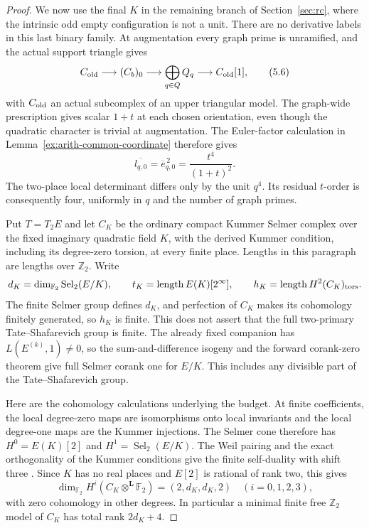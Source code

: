 \documentclass[11pt]{article}
\theoremstyle{definition}
\theoremstyle{remark}
\begin{document}
\begin{proof}\leavevmode
We now use the final $K$ in the remaining branch of Section~\ref{sec:rc},
where the intrinsic odd empty configuration is not a unit.
There are no derivative labels in this
last binary family. At augmentation every graph prime is unramified,
and the actual support triangle gives
\[
 C_{\rm old}\longrightarrow(C_b)_0
       \longrightarrow\bigoplus_{q\in Q}Q_q\longrightarrow C_{\rm old}[1],
                                                                    \tag{5.6}
\]
with $C_{\rm old}$ an actual subcomplex of an upper triangular model.
The graph-wide prescription gives scalar $1+t$ at each chosen
orientation, even though the quadratic character is trivial at
augmentation. The Euler-factor calculation in
Lemma~\ref{ex:arith-common-coordinate} therefore gives
\[
 \overline{l_{q,0}}=\overline e_{q,0}^{\,2}
                  =\frac{t^4}{(1+t)^2}.
\]
The two-place local determinant differs only by the unit $q^4$.
Its residual $t$-order is consequently four, uniformly in $q$ and
the number of graph primes.

Put $T=T_2E$ and let $C_K$ be the ordinary compact Kummer
Selmer complex over the fixed imaginary quadratic field $K$,
with the derived Kummer condition, including its degree-zero
torsion, at every finite place. Lengths in this paragraph are
lengths over $\mathbb Z_2$. Write
\[
 d_K=\dim_{\mathbb F_2}\operatorname{Sel}_2(E/K),\qquad
 t_K=\operatorname{length}E(K)[2^\infty],\qquad
 h_K=\operatorname{length}H^2(C_K)_{\rm tors}.
\]
The finite Selmer group defines $d_K$, and perfection of $C_K$
makes its cohomology finitely generated, so $h_K$ is finite.
This does not assert that the full two-primary Tate--Shafarevich
group is finite. The already fixed companion has
$L(E^{(k)},1)\ne0$, so the sum-and-difference isogeny and the
forward corank-zero theorem give full Selmer corank one for $E/K$.
This includes any divisible part of the Tate--Shafarevich group.

Here are the cohomology calculations underlying the budget.
At finite coefficients, the local degree-zero maps are
isomorphisms onto local invariants and the local degree-one maps
are the Kummer injections. The Selmer cone therefore has
$H^0=E(K)[2]$ and $H^1=\operatorname{Sel}_2(E/K)$.
The Weil pairing and the exact orthogonality of the Kummer
conditions give the finite self-duality with shift three
\cite[5.1.1--5.1.6 and 6.3.4]{nekovar}. Since $K$ has no
real places and $E[2]$ is rational of rank two, this gives
\[
 \dim_{\mathbb F_2}H^i(C_K\otimes^{\mathbf L}\mathbb F_2)
       =(2,d_K,d_K,2)\quad(i=0,1,2,3),                         \tag{5.7a}
\]
with zero cohomology in other degrees. In particular a minimal
finite free $\mathbb Z_2$ model of $C_K$ has total rank $2d_K+4$.


\end{proof}
\end{document}
